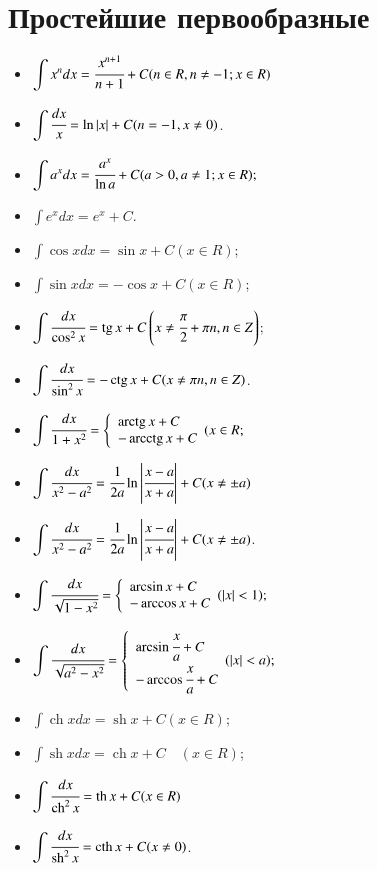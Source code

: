 \documentclass[twoside, a4paperpt]{extarticle}
\begin{document}
\section*{Простейшие первообразные}

\begin{multicols}{2}
    \begin{itemize}
        \item $\displaystyle \int x^{n} d x=\cfrac{x^{n+1}}{n+1}+C(n \in R, n \neq-1 ; x \in R)$
        \item $\displaystyle \int \cfrac{d x}{x}=\ln |x|+C(n=-1, x \neq 0)$.
        \item $\displaystyle \int a^{x} d x=\cfrac{a^{x}}{\ln a}+C(a>0, a \neq 1 ; x \in R) ; $
        \item $\displaystyle \int e^{x} d x=e^{x}+C$.
        \item $\displaystyle \int \cos x d x=\sin x+C(x \in R)$;
        \item $\displaystyle \int \sin x d x=-\cos x+C(x \in R)$;
        \item $\displaystyle \int \cfrac{d x}{\cos ^{2} x}=\operatorname{tg} x+C\left(x \neq \cfrac{\pi}{2}+\pi n, n \in Z\right)$;
        \item $\displaystyle \int \cfrac{d x}{\sin ^{2} x}=-\operatorname{ctg} x+C(x \neq \pi n, n \in Z)$.
        \item $\displaystyle \int \cfrac{d x}{1+x^{2}}=\left\{\begin{array}{l}\operatorname{arctg} x+C \\ -\operatorname{arcctg} x+C\end{array}(x \in R ;\right.$
        \item $\displaystyle \int \cfrac{d x}{x^{2}-a^{2}}=\cfrac{1}{2 a} \ln \left|\cfrac{x-a}{x+a}\right|+C(x \neq \pm a)$
        \item $\displaystyle \int \cfrac{d x}{x^{2}-a^{2}}=\cfrac{1}{2 a} \ln \left|\cfrac{x-a}{x+a}\right|+C(x \neq \pm a)$.
        \item $\displaystyle \int \cfrac{d x}{\sqrt{1-x^{2}}}=\left\{\begin{array}{l}\arcsin x+C \\ -\arccos x+C\end{array}(|x|<1) ;\right.$
        \item $\displaystyle \int \cfrac{d x}{\sqrt{a^{2}-x^{2}}}=\left\{\begin{array}{l}\arcsin \cfrac{x}{a}+C \\ -\arccos \cfrac{x}{a}+C\end{array}(|x|<a) ;\right.$ 
        \item $\displaystyle \int \operatorname{ch} x d x=\operatorname{sh} x+C(x \in R) ; \quad$
        \item $\displaystyle \int \operatorname{sh} x d x=\operatorname{ch} x+C \quad(x \in R)$;
        \item $\displaystyle \int \cfrac{d x}{\operatorname{ch}^{2} x}=\operatorname{th} x+C(x \in R)$
        \item $\displaystyle \int \cfrac{d x}{\operatorname{sh}^{2} x}=\operatorname{cth} x+C(x \neq 0)$.
    \end{itemize}
\end{multicols}
\end{document}
